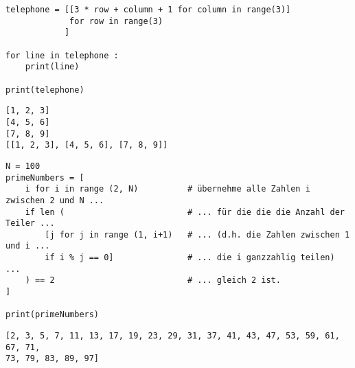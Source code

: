 
\begin{frame}[fragile]
%
\begin{codebox}
\begin{verbatim}
telephone = [[3 * row + column + 1 for column in range(3)]
             for row in range(3)
            ]

for line in telephone :
    print(line)

print(telephone)
\end{verbatim}
\end{codebox}
%
\begin{cmdbox}
\begin{verbatim}
[1, 2, 3]
[4, 5, 6]
[7, 8, 9]
[[1, 2, 3], [4, 5, 6], [7, 8, 9]]
\end{verbatim}
\end{cmdbox}
%
\end{frame}


\begin{frame}[fragile]
%
\begin{codebox}
\begin{verbatim}
N = 100
primeNumbers = [
    i for i in range (2, N)          # übernehme alle Zahlen i zwischen 2 und N ...
    if len (                         # ... für die die die Anzahl der Teiler ...
        [j for j in range (1, i+1)   # ... (d.h. die Zahlen zwischen 1 und i ...
        if i % j == 0]               # ... die i ganzzahlig teilen) ...
    ) == 2                           # ... gleich 2 ist.
]

print(primeNumbers)

\end{verbatim}
\end{codebox}
%
\begin{cmdbox}
\begin{verbatim}
[2, 3, 5, 7, 11, 13, 17, 19, 23, 29, 31, 37, 41, 43, 47, 53, 59, 61, 67, 71,
73, 79, 83, 89, 97]
\end{verbatim}
\end{cmdbox}
%
\end{frame}